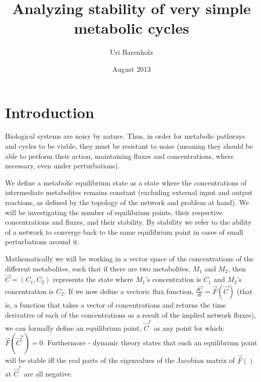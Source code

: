 \documentclass[a4page,notitlepage]{article}
\title{Analyzing stability of very simple metabolic cycles}
\author{Uri Barenholz}
\date{August 2013}
\begin{document}
\section{Introduction}
Biological systems are noisy by nature.
Thus, in order for metabolic pathways and cycles to be viable, they must be resistant to noise (meaning they should be able to perform their action, maintaining fluxes and concentrations, where necessary, even under perturbations).

We define a metabolic equilibrium state as a state where the concentrations of intermediate metabolites remains constant (excluding external input and output reactions, as defined by the topology of the network and problem at hand).
We will be investigating the number of equilibrium points, their respective concentrations and fluxes, and their stability.
By stability we refer to the ability of a network to converge back to the same equilibrium point in cases of small perturbations around it.

Mathematically we will be working in a vector space of the concentrations of the different metabolites, such that if there are two metabolites, $M_1$ and $M_2$, then $\vec{C}=(C_1,C_2)$ represents the state where $M_1$'s concentration is $C_1$ and $M_2$'s concentration is $C_2$.
If we now define a vectoric flux function, $\frac{d\vec{C}}{dt}=\vec{F}(\vec{C})$ (that is, a function that takes a vector of concentrations and returns the time derivative of each of the concentrations as a result of the implied network fluxes), we can formally define an equilibrium point, $\vec{C}^*$ as any point for which: $\vec{F}(\vec{C}^*)=0$.
Furthermore - dynamic theory states that such an equilibrium point will be stable iff the real parts of the eigenvalues of the Jacobian matrix of $\vec{F}()$ at $\vec{C}^*$ are all negative.
\end{document}
